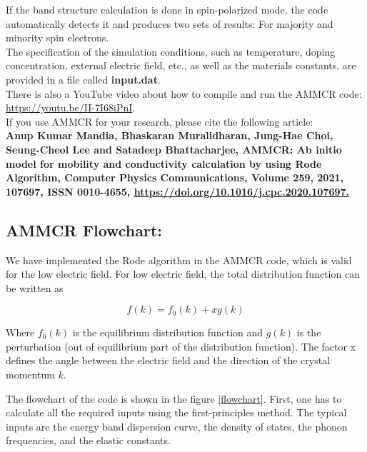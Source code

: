\documentclass[12pt]{article}
\begin{document}
If the band structure calculation is done in spin-polarized mode, the code automatically detects it and produces two sets of results: For majority and minority spin electrons. \\

The specification of the simulation conditions, such as temperature, doping concentration, external electric field, etc., as well as the materials constants, are provided in a file called \textbf{input.dat}. \\

There is also a YouTube video about how to compile and run the AMMCR code: \\ \href{https://youtu.be/II-7I68iPnI}{https://youtu.be/II-7I68iPnI}. \\ 

If you use AMMCR for your research, please cite the following article: \\
\textbf{Anup Kumar Mandia, Bhaskaran Muralidharan, Jung-Hae Choi, Seung-Cheol Lee and Satadeep Bhattacharjee, AMMCR: Ab initio model for mobility and conductivity calculation by using Rode Algorithm, Computer Physics Communications, Volume 259, 2021, 107697, ISSN 0010-4655, \href{https://doi.org/10.1016/j.cpc.2020.107697}{ https://doi.org/10.1016/j.cpc.2020.107697.}} \\ 

\subsection{AMMCR Flowchart:}

We have implemented the Rode algorithm in the AMMCR code, which is valid for the low electric field. For low electric field, the total distribution function can be written as

\begin{equation} \label{equilibrium_distribution}
    f(k) = f_0(k) + x g(k)
\end{equation}

Where $f_0(k)$ is the equilibrium distribution function and $g(k)$ is the perturbation (out of equilibrium part of the distribution function). The factor x defines the angle between the electric field and the direction of the crystal momentum $k$.

The flowchart of the code is shown in the figure \ref{flowchart}. First, one has to calculate all the required inputs using the first-principles method. The typical inputs are the energy band dispersion curve, the density of states, the phonon frequencies, and the elastic constants.
\end{document}
